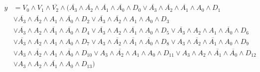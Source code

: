 \documentclass[document.tex]{subfiles}
\begin{document}
\begin{align}
y & = V_{0} \land V_{1} \land \overline{V_{2}} \land (\overline{A_{3}} \land
	\overline{A_{2}} \land \overline{A_{1}} \land \overline{A_{0}} \land D_{0} \lor
	\overline{A_{3}} \land \overline{A_{2}} \land \overline{A_{1}} \land A_{0} \land
	D_{1} \nonumber \\ & \lor \overline{A_{3}} \land \overline{A_{2}} \land A_{1}
	\land \overline{A_{0}} \land D_{2} \lor \overline{A_{3}} \land \overline{A_{2}}
	\land A_{1} \land A_{0} \land D_{3} \nonumber \\ & \lor \overline{A_{3}} \land
	A_{2} \land \overline{A_{1}} \land \overline{A_{0}} \land D_{4} \lor
	\overline{A_{3}} \land A_{2} \land \overline{A_{1}} \land A_{0} \land D_{5} \lor
	\overline{A_{3}} \land A_{2} \land A_{1} \land \overline{A_{0}} \land D_{6}
	\nonumber \\ & \lor \overline{A_{3}} \land A_{2} \land A_{1} \land A_{0} \land
	D_{7} \lor A_{3} \land \overline{A_{2}} \land \overline{A_{1}} \land
	\overline{A_{0}} \land D_{8} \lor A_{3} \land \overline{A_{2}} \land
	\overline{A_{1}} \land A_{0} \land D_{9} \nonumber \\ & \lor A_{3} \land
	\overline{A_{2}} \land A_{1} \land \overline{A_{0}} \land D_{10} \lor A_{3}
	\land \overline{A_{2}} \land A_{1} \land A_{0} \land D_{11} \lor A_{3} \land
	A_{2} \land \overline{A_{1}} \land \overline{A_{0}} \land D_{12} \nonumber \\ &
	\lor A_{3} \land A_{2} \land \overline{A_{1}} \land A_{0} \land D_{13})
\end{align}
\end{document}
